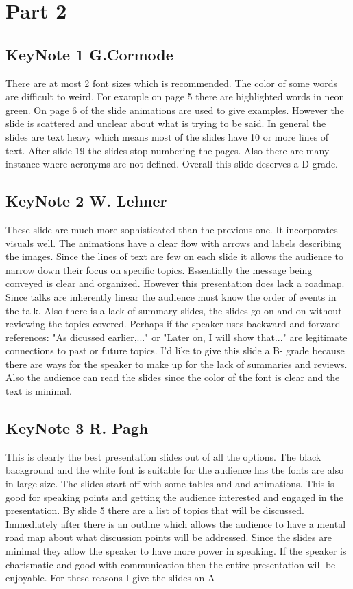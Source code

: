 \documentclass{article}
\begin{document}
\section{Part 2}
\subsection{KeyNote 1 G.Cormode}

There are at most 2 font sizes which is recommended. The color of some words are difficult to weird. For example on page 5 there are highlighted words in neon green. On page 6 of the slide animations are used to give examples. However the slide is scattered and unclear about what is trying to be said. In general the slides are text heavy which means most of the slides have 10 or more lines of text. After slide 19 the slides stop numbering the pages. Also there are many instance where acronyms are not defined. Overall this slide deserves a D grade.

\subsection{KeyNote 2 W. Lehner}

These slide are much more sophisticated than the previous one. It incorporates visuals well. The animations have a clear flow with arrows and labels describing the images. Since the lines of text are few on each slide it allows the audience to narrow down their focus on specific topics. Essentially the message being conveyed is clear and organized. However this presentation does lack a roadmap. Since talks are inherently linear the audience must know the order of events in the talk. Also there is a lack of summary slides, the slides go on and on without reviewing the topics covered. Perhaps if the speaker uses backward and forward references: "As dicussed earlier,..." or "Later on, I will show that..." are legitimate connections to past or future topics. I'd like to give this slide a B- grade because there are ways for the speaker to make up for the lack of summaries and reviews. Also the audience can read the slides since the color of the font is clear and the text is minimal.


\subsection{KeyNote 3 R. Pagh}

This is clearly the best presentation slides out of all the options. The black background and the white font is suitable for the audience has the fonts are also in large size. The slides start off with some tables and and animations. This is good for speaking points and getting the audience interested and engaged in the presentation. By slide 5 there are a list of topics that will be discussed. Immediately after there is an outline which allows the audience to have a mental road map about what discussion points will be addressed. Since the slides are minimal they allow the speaker to have more power in speaking. If the speaker is charismatic and
good with communication then the entire presentation will be enjoyable. For these reasons I give the slides an A
\end{document}
